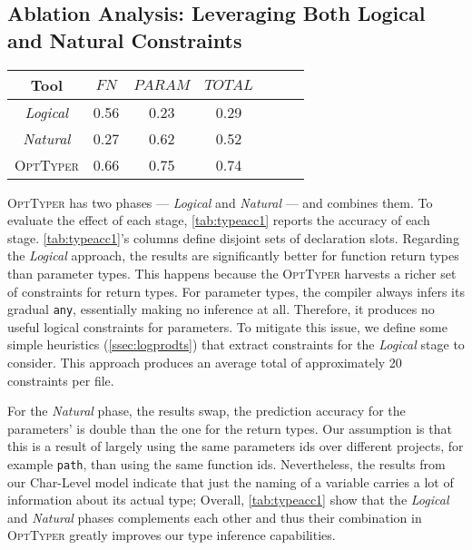 \documentclass[acmsmall,nonacm]{acmart}\settopmatter{printfolios=true,printccs=false,printacmref=false}
\newcommand{\projectname}{\textsc{OptTyper}\xspace}
\begin{document}
\subsection{Ablation Analysis:  Leveraging Both Logical and Natural Constraints}\label{ssec:ablation}

\begin{table*}[t]
	\centering
	\caption{Ablation analysis of \projectname, the cells report accuracy; FN refers to return types of functions and PARAM
	represents parameters.}
\label{tab:typeacc1}
	\begin{tabular}{ccccccc}
		\toprule
		Tool  & $\textit{FN}$ & 
		$\textit{PARAM}$ & $\textit{TOTAL}$ \\
		
		\midrule
		\textit{Logical}      & 0.56                                   & 0.23                                 & 0.29                                  \\
		\textit{Natural}      & 0.27                                    & 0.62                                 & 0.52                                   \\
		\projectname  & 0.66         & 0.75         & 0.74\\
		\bottomrule
	\end{tabular}
\end{table*}
\projectname has two phases --- \textit{Logical} and \textit{Natural} --- and combines them.  To evaluate the effect of each stage, \cref{tab:typeacc1} reports the accuracy of each stage.
\cref{tab:typeacc1}'s columns define disjoint sets of declaration slots.
Regarding the \textit{Logical} approach, the results are significantly better for function return types
than parameter types.
This happens because the \projectname harvests a richer set of constraints for return types.
For parameter types, the compiler always 
infers its gradual \texttt{\small{any}}, essentially making no inference at all. Therefore, it produces no useful logical constraints for parameters.
To mitigate this issue, we define some simple heuristics (\cref{ssec:logprodts}) that extract constraints for the \textit{Logical} stage to consider. This approach produces an average total of approximately 20 constraints per file. 

For the \textit{Natural} phase, the results swap, the prediction accuracy for the parameters' is double than the one for the return types. Our assumption is that
this is a result of largely using the same parameters ids over different projects, for example \lstinline{path}, than using the same function ids. Nevertheless, the results from our Char-Level model indicate that just the naming of a variable carries a
lot of information about its actual type;   
Overall, \cref{tab:typeacc1} show that the \textit{Logical} and \textit{Natural} phases complements each other and thus their combination in \projectname greatly improves our type inference capabilities.
\end{document}

